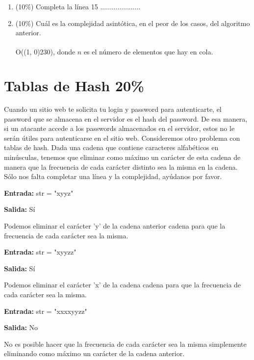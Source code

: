 \documentclass[10 pt]{article}
\begin{document}
\begin{enumerate}[label=(\Alph*)]
  \item (10\%) Completa la línea 15  .....................
  \item (10\%) Cuál es la complejidad asintótica, en el peor de los casos, del algoritmo anterior. \\ \\
  O(\line(1, 0){230}), donde $n$ es el número de elementos que hay en cola.
\end{enumerate}


\newpage

\section{Tablas de Hash 20\%}
Cuando un sitio web te solicita tu login y password para autenticarte, el password que se almacena en el servidor es el hash del password. De esa manera, si un atacante accede a los passwords almacenados en el servidor, estos no le serán útiles para autenticarse en el sitio web. Consideremos otro problema con tablas de hash. 
Dada una cadena que contiene caracteres alfabéticos en minúsculas, tenemos que eliminar como máximo un carácter de esta cadena de manera que la frecuencia de cada carácter distinto sea la misma en la cadena. Sólo nos falta completar una línea y la complejidad, ayúdanos por favor.

\begin{multicols}{2}
\noindent
    \textbf{Entrada:} str = "xyyz" 

\noindent
    \textbf{Salida:} Sí 

\noindent
    Podemos eliminar el carácter 'y' de la cadena anterior cadena para que la frecuencia de cada carácter sea la misma. 

\noindent
    \textbf{Entrada:} str = "xyyzz" 

\noindent
    \textbf{Salida:} Sí 

\noindent
    Podemos eliminar el carácter 'x' de la cadena cadena para que la frecuencia de cada carácter sea la misma.

\noindent
    \textbf{Entrada:} str = "xxxxyyzz" 

\noindent
    \textbf{Salida:} No 

\noindent
    No es posible hacer que la frecuencia de cada carácter sea la misma simplemente eliminando como máximo un carácter de la cadena anterior.
\end{multicols}
\end{document}
